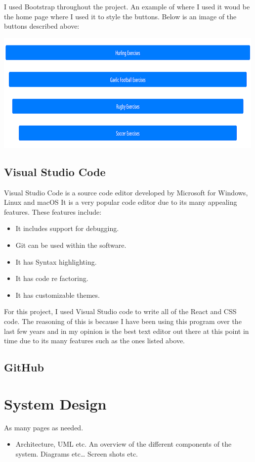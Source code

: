 I used Bootstrap throughout the project. An example of where I used it woud be the home page where I used it to style the buttons. Below is an image of the buttons described above:

\begin{center}    
\includegraphics{img/button.png}
\end{center}

\section{Visual Studio Code}
Visual Studio Code is a source code editor developed by Microsoft for Windows, Linux and macOS\cite{Visual} It is a very popular code editor due to its many appealing features. These features include:

\begin{itemize}
\item It includes support for debugging.
\item Git can be used within the software.
\item It has Syntax highlighting.
\item It has code re factoring.
\item It has customizable themes.
\end{itemize}

For this project, I used Visual Studio code to write all of the React and CSS code. The reasoning of this is because I have been using this program over the last few years and in my opinion is the best text editor out there at this point in time due to its many features such as the ones listed above.

\section{GitHub}

\chapter{System Design}
As many pages as needed.
\begin{itemize}
\item Architecture, UML etc. An overview of the different components of the system. Diagrams etc… Screen shots etc.
\end{itemize}

